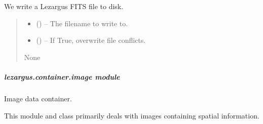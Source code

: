 \documentclass[letterpaper,11pt,english]{sphinxmanual}
\begin{document}
\begin{savenotes}
\begin{fulllineitems}
\begin{savenotes}
\begin{fulllineitems}
\sphinxAtStartPar
We write a Lezargus FITS file to disk.
\begin{quote}\begin{description}
\begin{itemize}
\item {} 
\sphinxAtStartPar
{} () – The filename to write to.

\item {} 
\sphinxAtStartPar
{} (\sphinxstyleliteralemphasis{\sphinxupquote{, }}) – If True, overwrite file conflicts.

\end{itemize}

\sphinxAtStartPar
None

\end{description}\end{quote}

\end{fulllineitems}\end{savenotes}


\end{fulllineitems}\end{savenotes}


\sphinxstepscope


\subparagraph{lezargus.container.image module}
\label{\detokenize{code/lezargus.container.image:module-lezargus.container.image}}\label{\detokenize{code/lezargus.container.image:lezargus-container-image-module}}\label{\detokenize{code/lezargus.container.image::doc}}
\sphinxAtStartPar
Image data container.

\sphinxAtStartPar
This module and class primarily deals with images containing spatial
information.
\end{document}
